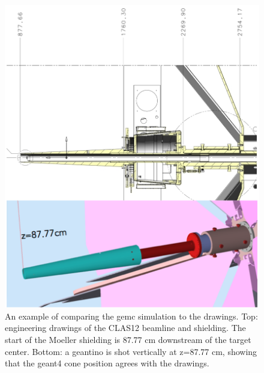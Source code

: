 \begin{figure}
	\centering
	\includegraphics[width=0.95\columnwidth,keepaspectratio]{img/cadValidationExample.png}
	\caption{An example of comparing the gemc simulation to the drawings. Top: engineering drawings of
             the CLAS12 beamline and shielding. The start of the Moeller shielding is 87.77 cm downstream
             of the target center. Bottom: a geantino is shot vertically at z=87.77 cm, showing that the
             geant4 cone position agrees with the drawings.}
	\label{fig:cadValidationExample}
\end{figure}

